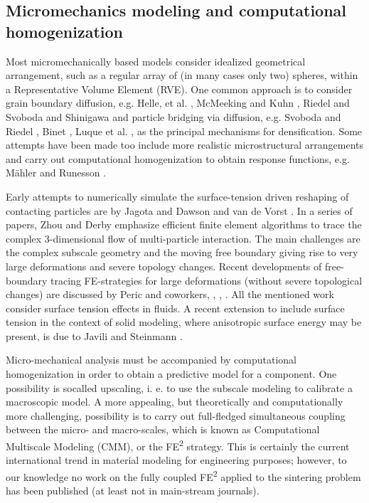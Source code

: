\documentclass[ExampleMasters.tex]{subfiles}
\begin{document}
\subsection{Micromechanics modeling and computational homogenization}

Most micromechanically based models consider idealized geometrical arrangement, such as a regular array of (in many cases only two) spheres, within a Representative Volume Element (RVE).
One common approach is to consider grain boundary diffusion, e.g. Helle, et al. \cite{HelEasAsh1985}, McMeeking and Kuhn \cite{McMKuh1992}, Riedel and Svoboda \cite{RieSvo1993} and Shinigawa \cite{Shi1996} and particle bridging via diffusion, e.g. Svoboda and Riedel \cite{SvoRie1995}, Binet \cite{BinLenHeaGer2004}, Luque et al. \cite{LuqAldMarMarSevFar2005}, as the principal mechanisms for densification.
Some attempts have been made too include more realistic microstructural arrangements and carry out computational homogenization to obtain response functions, e.g. Mähler and Runesson \cite{MahRun2000}.

Early attempts to numerically simulate the surface-tension driven reshaping of contacting particles are by Jagota and Dawson \cite{JagDaw1988a,JagDaw1988b} and van de Vorst \cite{Vorst1993}.
In a series of papers, Zhou and Derby \cite{ZhoDer1998,ZhoDer2001} emphasize efficient finite element algorithms to trace the complex 3-dimensional flow of multi-particle interaction.
The main challenges  are the complex subscale geometry and the moving free boundary giving rise to very large deformations and severe topology changes.
Recent developments of free-boundary tracing FE-strategies for large deformations (without severe topological changes) are discussed by Peric and coworkers, \cite{DetPer2006}, \cite{SakPer2006a}, \cite{SakPer2006b}.
All the mentioned work consider surface tension effects in fluids.
A recent extension to include surface tension in the context of solid modeling, where anisotropic surface energy may be present, is due to Javili and Steinmann \cite{JavSte2010:3d}.

Micro-mechanical analysis must be accompanied by computational homogenization in order to obtain a predictive model for a component.
One possibility is socalled upscaling, i. e. to use the subscale modeling to calibrate a macroscopic model.
A more appealing, but theoretically and computationally more challenging, possibility is to carry out full-fledged simultaneous coupling between the micro- and macro-scales, which is known as Computational Multiscale Modeling (CMM), or the FE\textsuperscript{2} strategy.
This is certainly the current international trend in material modeling for engineering purposes; however, to our knowledge no work on the fully coupled FE\textsuperscript{2} applied to the sintering problem has been published (at least not in main-stream journals).
\end{document}
